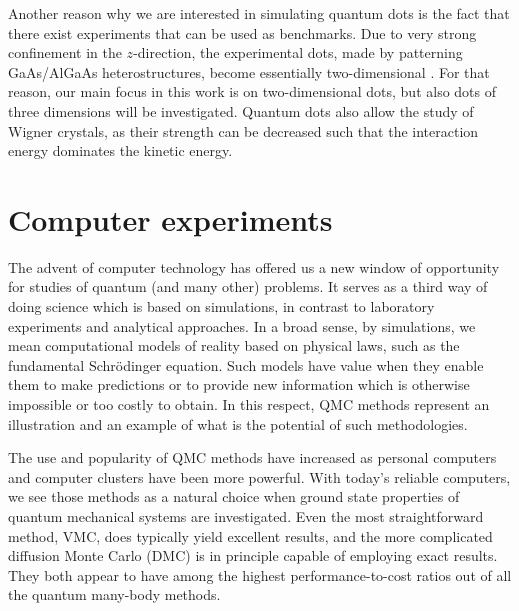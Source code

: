Another reason why we are interested in simulating quantum dots is the fact that there exist experiments that can be used as benchmarks. Due to very strong confinement in the $z$-direction, the experimental dots, made by patterning GaAs/AlGaAs heterostructures, become essentially two-dimensional \cite{marzin_photoluminescence_1994,brunner_sharp-line_1994}. For that reason, our main focus in this work is on two-dimensional dots, but also dots of three dimensions will be investigated. Quantum dots also allow the study of Wigner crystals, as their strength can be decreased such that the interaction energy dominates the kinetic energy. 

\section{Computer experiments}
The advent of computer technology has offered us a new window of opportunity for studies of quantum (and many other) problems. It serves as a third way of doing science which is based on simulations, in contrast to laboratory experiments and analytical approaches. In a broad sense, by simulations, we mean computational models of reality based on physical laws, such as the fundamental Schrödinger equation. Such models have value when they enable them to make predictions or to provide new information which is otherwise impossible or too costly to obtain. In this respect, QMC methods represent an illustration and an example of what is the potential of such methodologies.

The use and popularity of QMC methods have increased as personal computers and computer clusters have been more powerful. With today's reliable computers, we see those methods as a natural choice when ground state properties of quantum mechanical systems are investigated. Even the most straightforward method, VMC, does typically yield excellent results, and the more complicated diffusion Monte Carlo (DMC) is in principle capable of employing exact results. They both appear to have among the highest performance-to-cost ratios out of all the quantum many-body methods. 

